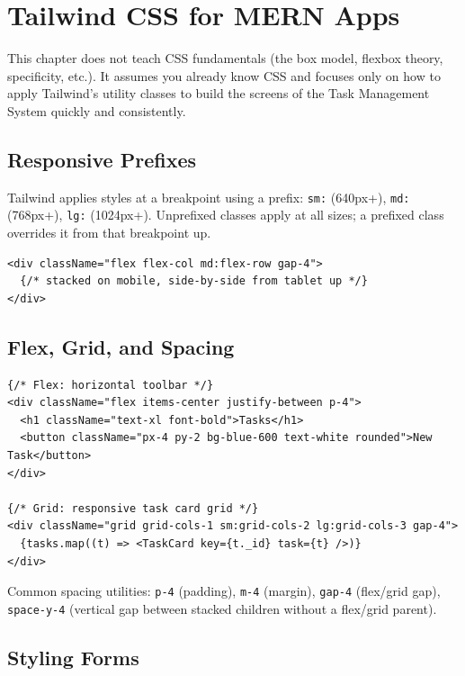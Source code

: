 \chapter{Tailwind CSS for MERN Apps}

\begin{notebox}[NOTE]
This chapter does not teach CSS fundamentals (the box model, flexbox theory,
specificity, etc.). It assumes you already know CSS and focuses only on how
to apply Tailwind's utility classes to build the screens of the Task
Management System quickly and consistently.
\end{notebox}

\section{Responsive Prefixes}

Tailwind applies styles at a breakpoint using a prefix: \texttt{sm:}
(640px+), \texttt{md:} (768px+), \texttt{lg:} (1024px+). Unprefixed classes
apply at all sizes; a prefixed class overrides it from that breakpoint up.

\begin{lstlisting}
<div className="flex flex-col md:flex-row gap-4">
  {/* stacked on mobile, side-by-side from tablet up */}
</div>
\end{lstlisting}

\section{Flex, Grid, and Spacing}

\begin{lstlisting}
{/* Flex: horizontal toolbar */}
<div className="flex items-center justify-between p-4">
  <h1 className="text-xl font-bold">Tasks</h1>
  <button className="px-4 py-2 bg-blue-600 text-white rounded">New Task</button>
</div>

{/* Grid: responsive task card grid */}
<div className="grid grid-cols-1 sm:grid-cols-2 lg:grid-cols-3 gap-4">
  {tasks.map((t) => <TaskCard key={t._id} task={t} />)}
</div>
\end{lstlisting}

Common spacing utilities: \texttt{p-4} (padding), \texttt{m-4} (margin),
\texttt{gap-4} (flex/grid gap), \texttt{space-y-4} (vertical gap between
stacked children without a flex/grid parent).

\section{Styling Forms}

